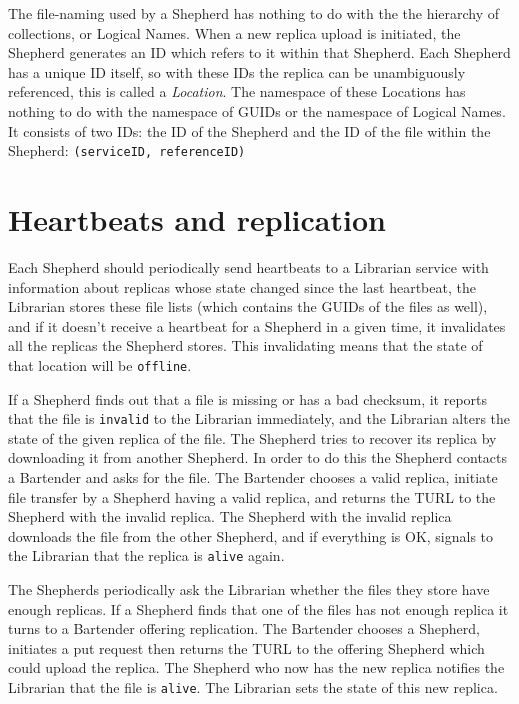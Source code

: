 \documentclass{book}
\begin{document}
The file-naming used by a Shepherd has nothing to do with the the hierarchy of collections, or Logical Names. When a new replica upload is initiated, the Shepherd generates an ID which refers to it within that Shepherd. Each Shepherd has a unique ID itself, so with these IDs the replica can be unambiguously referenced, this is called a \emph{Location}. The namespace of these Locations has nothing to do with the namespace of GUIDs or the namespace of Logical Names. It consists of two IDs: the ID of the Shepherd and the ID of the file within the Shepherd: \verb!(serviceID, referenceID)!


\section{Heartbeats and replication} %
\label{sec:heartbeats_and_replication}
Each Shepherd should periodically send heartbeats to a Librarian service with information about replicas whose state changed since the last heartbeat, the Librarian stores these file lists (which contains the GUIDs of the files as well), and if it doesn’t receive a heartbeat for a Shepherd in a given time, it invalidates all the replicas the Shepherd stores. This invalidating means that the state of that location will be \verb!offline!.

If a Shepherd finds out that a file is missing or has a bad checksum, it reports that the file is \verb#invalid# to the Librarian immediately, and the Librarian alters the state of the given replica of the file. The Shepherd tries to recover its replica by downloading it from another Shepherd. In order to do this the Shepherd contacts a Bartender and asks for the file. The Bartender chooses a valid replica, initiate file transfer by a Shepherd having a valid replica, and returns the TURL to the Shepherd with the invalid replica. The Shepherd with the invalid replica downloads the file from the other Shepherd, and if everything is OK, signals to the Librarian that the replica is \verb!alive! again.

The Shepherds periodically ask the Librarian whether the files they store have enough replicas. If a Shepherd finds that one of the files has not enough replica it turns to a Bartender offering replication. The Bartender chooses a Shepherd, initiates a put request then returns the TURL to the offering Shepherd which could upload the replica. The Shepherd who now has the new replica notifies the Librarian that the file is \verb!alive!. The Librarian sets the state of this new replica.
\end{document}

